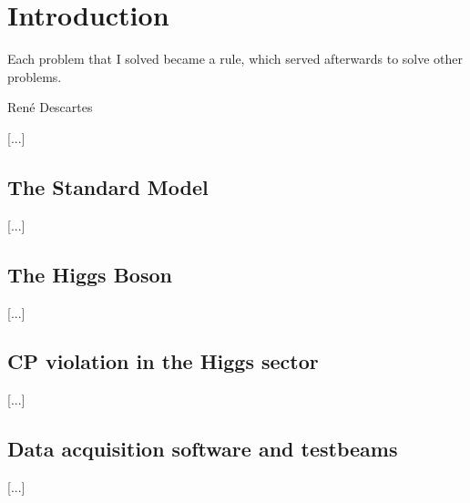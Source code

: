 \chapter{Introduction}

\epigraph{Each problem that I solved became a rule, which served afterwards to solve other problems.}{Ren\'{e} Descartes}

[...]

\section{The Standard Model}
[...]

\section{The Higgs Boson}
[...]

\section{CP violation in the Higgs sector}
[...]

\section{Data acquisition software and testbeams}
[...]